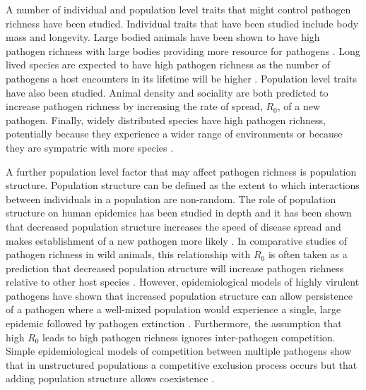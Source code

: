 

A number of individual and population level traits that might control pathogen richness have been studied.
Individual traits that have been studied include body mass and longevity.
Large bodied animals have been shown to have high pathogen richness with large bodies providing more resource for pathogens \cite{kamiya2014determines, arneberg2002host, poulin1995phylogeny, bordes2008bat}.
Long lived species are expected to have high pathogen richness as the number of pathogens a host encounters in its lifetime will be higher \cite{nunn2003comparative, ezenwa2006host}. 
Population level traits have also been studied.
Animal density \cite{kamiya2014determines, nunn2003comparative, arneberg2002host} and sociality \cite{bordes2007rodent, vitone2004body, altizer2003social, ezenwa2006host} are both predicted to increase pathogen richness by increasing the rate of spread, $R_0$, of a new pathogen.
Finally, widely distributed species have high pathogen richness, potentially because they experience a wider range of environments or because they are sympatric with more species \cite{kamiya2014determines, nunn2003comparative, luis2013comparison}.




A further population level factor that may affect pathogen richness is population structure.
Population structure can be defined as the extent to which interactions between individuals in a population are non-random.
The role of population structure on human epidemics has been studied in depth and it has been shown that decreased population structure increases the speed of disease spread and makes establishment of a new pathogen more likely \cite{colizza2007invasion, vespignani2008reaction}.
In comparative studies of pathogen richness in wild animals, this relationship with $R_0$ is often taken as a prediction that decreased population structure will increase pathogen richness relative to other host species \cite{nunn2003comparative, morand2000wormy, poulin2014parasite, poulin2000diversity, altizer2003social}. 
However, epidemiological models of highly virulent pathogens have shown that increased population structure can allow persistence of a pathogen where a well-mixed population would experience a single, large epidemic followed by pathogen extinction \cite{blackwood2013resolving, plowright2011urban}.
Furthermore, the assumption that high $R_0$ leads to high pathogen richness ignores inter-pathogen competition.
Simple epidemiological models of competition between multiple pathogens show that in unstructured populations a competitive exclusion process occurs but that adding population structure allows coexistence \cite{qiu2013vector, allen2004sis, nunes2006localized}.


